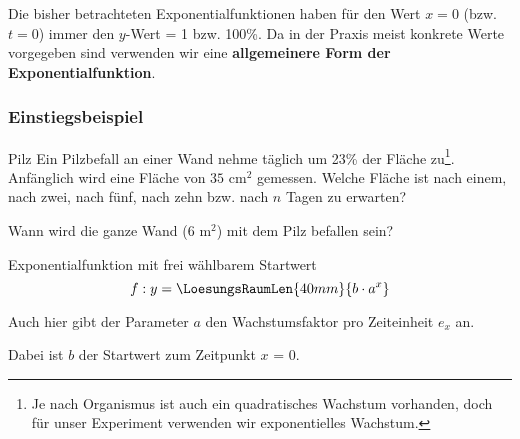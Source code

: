 Die bisher betrachteten Exponentialfunktionen haben für den Wert $x=0$ (bzw. $t=0$) immer den
$y$-Wert = 1 bzw. 100\%.
Da in der Praxis meist konkrete Werte vorgegeben sind verwenden wir
eine \textbf{allgemeinere Form der Exponentialfunktion}.

\subsubsection{Einstiegsbeispiel}

\begin{beispiel}{Pilz}{}
  Ein Pilzbefall an einer Wand nehme täglich um 23\% der Fläche
  zu\footnote{Je nach Organismus ist auch ein quadratisches Wachstum
  vorhanden, doch für unser Experiment verwenden wir exponentielles Wachstum.}.
  Anfänglich wird eine Fläche von $35$ $\text{cm}^2$ gemessen.
  Welche Fläche ist nach einem, nach zwei, nach fünf, nach zehn
  bzw. nach $n$ 
  Tagen zu erwarten?


  Wann wird die ganze Wand ($6 \text{ m}^2$) mit dem Pilz befallen
  sein?
  

\end{beispiel}

\newpage


\begin{gesetz}{Exponentialfunktion mit frei wählbarem Startwert}{}
$$f: y = \LoesungsRaumLen{40mm}{b\cdot{}a^x}$$

Auch hier gibt der Parameter $a$ den Wachstumsfaktor pro Zeiteinheit $e_x$ an.

Dabei ist $b$ der Startwert zum Zeitpunkt $x$ = 0.
\end{gesetz}


